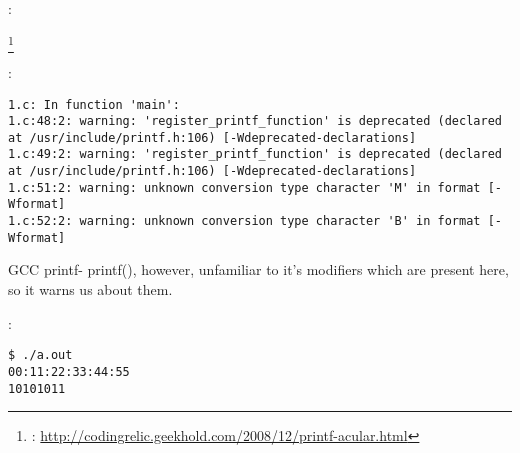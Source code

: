 :


\footnote{:
\url{http://codingrelic.geekhold.com/2008/12/printf-acular.html}}

:

\begin{lstlisting}
1.c: In function 'main':
1.c:48:2: warning: 'register_printf_function' is deprecated (declared at /usr/include/printf.h:106) [-Wdeprecated-declarations]
1.c:49:2: warning: 'register_printf_function' is deprecated (declared at /usr/include/printf.h:106) [-Wdeprecated-declarations]
1.c:51:2: warning: unknown conversion type character 'M' in format [-Wformat]
1.c:52:2: warning: unknown conversion type character 'B' in format [-Wformat]
\end{lstlisting}

\ac{GCC}  printf- printf(),
{however, unfamiliar to it's modifiers which are present here, so it warns us about them}.

:

\begin{lstlisting}
$ ./a.out
00:11:22:33:44:55
10101011
\end{lstlisting}

